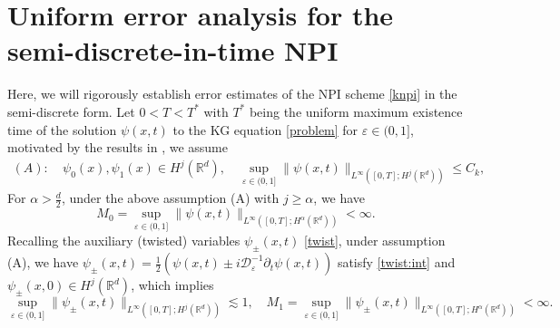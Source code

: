 \documentclass[final,leqno,showlabe]{siamltex}
\begin{document}
\section{Uniform error analysis for the semi-discrete-in-time  NPI}
\label{sec:ana}
Here, we will rigorously establish error estimates of the NPI scheme \eqref{knpi} in the semi-discrete form. Let $0<T<T^{*}$ with $T^{*}$  being the uniform maximum existence time of the solution $\psi(x,t)$ to the KG equation \eqref{problem} for $\varepsilon\in(0,1]$,  motivated by the results in \cite{Nested:2018,Comparison:2019}, we assume
\begin{align*}
(A):\ &\psi_0(x), \psi_1(x)\in H^{j}(\mathbb{R}^d), \quad\sup_{\varepsilon\in(0,1]}\|\psi(x,t)\|_{L^{\infty}([0,T];H^{j}(\mathbb{R}^d))}\leq C_k,%
\end{align*}
For $\alpha>\frac{d}{2}$, under the above assumption (A) with $j\ge\alpha$, we have
\begin{equation}\label{eq:infitybd}
M_0=\sup\limits_{\varepsilon\in(0,1]}\|\psi(x,t)\|_{L^{\infty}([0,T];H^\alpha(\mathbb{R}^d))}<\infty.
\end{equation}
Recalling the auxiliary (twisted) variables $\psi_\pm(x,t)$ \eqref{twist}, under assumption (A), we have $\psi_\pm(x,t)=\frac{1}{2}(\psi(x,t)\pm i\mathcal{D}_\varepsilon^{-1}\partial_t\psi(x,t))$ satisfy
\eqref{twist:int} and $\psi_\pm(x,0)\in H^{j}(\mathbb{R}^d)$, which implies
\begin{equation}
\sup\limits_{\varepsilon\in(0,1]}\|\psi_\pm(x,t)\|_{L^{\infty}([0,T];H^{j}(\mathbb{R}^d))}\lesssim 1,
\quad
M_1=\sup\limits_{\varepsilon\in(0,1]}\|\psi_\pm(x,t)\|_{L^{\infty}([0,T];H^\alpha(\mathbb{R}^d))}<\infty.
\end{equation}
%
\end{document}
